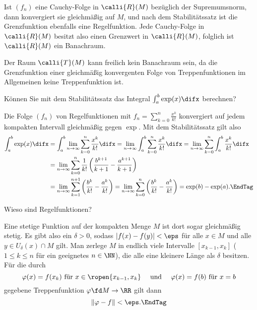 \begin{antwort}
Ist $(f_n)$ eine Cauchy-Folge in 
$\calli{R}(M)$ bezüglich der Supremumsnorm, dann 
konvergiert sie gleichmäßig auf $M$, und nach dem Stabilitätssatz ist 
die Grenzfunktion ebenfalls eine Regelfunktion. Jede Cauchy-Folge in 
$\calli{R}(M)$ besitzt also einen Grenzwert in 
$\calli{R}(M)$, folglich ist $\calli{R}(M)$ ein Banachraum. 

Der Raum $\calli{T}(M)$ kann freilich 
kein Banachraum sein, da die Grenzfunktion einer gleichmäßig 
konvergenten Folge von Treppenfunktionen im Allgemeinen
keine Treppenfunktion ist. 
\AntEnd
\end{antwort}


\begin{frage}
Können Sie mit dem 
Stabilitätssatz das Integral $\int_a^b \exp(x) \difx $ 
berechnen?
\end{frage}

\begin{antwort}
Die Folge $(f_n)$ von Regelfunktionen 
mit $f_n =\sum_{k=0}^n \frac{x^k}{k!}$  
konvergiert auf jedem kompakten Intervall gleichmäßig gegen $\exp$. 
Mit dem Stabilitätssatz gilt also
\begin{align}
\int_a^b \exp(x) \difx &=
\int_a^b \lim_{n\to\infty} \sum_{k=0}^n \frac{x^k}{k!}\difx = 
\lim_{n\to\infty} \int_a^b \sum_{k=0}^n \frac{x^k}{k!}\difx =
\lim_{n\to\infty} \sum_{k=0}^n \int_a^b \frac{x^k}{k!}\difx 
\notag
\\
&=
\lim_{n\to\infty} \sum_{k=0}^n 
\frac{1}{k!} 
\left( \frac{b^{k+1}}{k+1} 
-  \frac{a^{k+1}}{k+1} \right) 
\notag
\\
&=
\lim_{n\to\infty} 
\sum_{k=1}^{n+1} 
\left( \frac{b^k}{k!} -  \frac{a^k}{k!}  \right)
=
\lim_{n\to\infty}
\sum_{k=0}^n 
\left( \frac{b^k}{k!} - \frac{a^k}{k!} \right) 
= \exp(b)-\exp(a). 
\EndTag
\end{align}
\end{antwort}


\begin{frage}\label{06_regf}
Wieso sind  Regelfunktionen?
\end{frage}

\begin{antwort}
 Eine stetige Funktion auf der kompakten Menge $M$ ist dort sogar 
gleichmäßig stetig. Es gibt also ein $\delta>0$, sodass 
$|f(x)-f(y)| < \eps$ für alle $x\in M$ und alle $y\in U_\delta(x)\cap M$ 
gilt. Man zerlege $M$ in endlich viele Intervalle $[x_{k-1},x_k]$ 
($1\le k \le n$ für ein geeignetes $n\in\NN$), 
die alle eine kleinere Länge als $\delta$ besitzen. Für die durch 
\[
\varphi( x ) = f(x_k) \text{ für $x\in \ropen{ x_{k-1},x_k }$}
\quad\text{ und }\quad
\varphi( x ) = f(b) \text{ für $x=b$}  
\]
gegebene Treppenfunktion 
$\varphi\fd M\to\RR$ gilt dann 
\[
\| \varphi-f \| < \eps. \EndTag
\]
\end{antwort}

